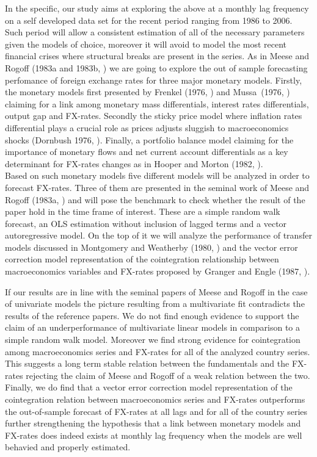 In the specific, our study aims at exploring the above at a monthly lag frequency on a self developed data set for the recent period ranging from 1986 to 2006. Such period will allow a consistent estimation of all of the necessary parameters given the models of choice, moreover it will avoid to model the most recent financial crises where structural breaks are present in the series.
As in Meese and Rogoff (1983a and 1983b, \cite{MeeseRogoffa,MeeseRogoffb}) we are going to explore the out of sample forecasting perfomance of foreign exchange rates for three major monetary models. Firstly, the monetary models first presented by Frenkel (1976, \cite{Frenkel1976}) and  Mussa\ (1976, \cite{Mussa1976}) claiming for a link among monetary mass differentials, interest rates differentials, output gap and FX-rates. Secondly the sticky price model where inflation rates differential plays a crucial role as prices adjusts sluggish to macroeconomics shocks (Dornbush 1976, \cite{Dornbusch}). Finally, a portfolio balance model claiming for the importance of monetary flows and net current account differentials as a key determinant for FX-rates changes as in Hooper and Morton (1982, \cite{HooperMorton1982}). \\
Based on such monetary models five different models will be analyzed in order to forecast FX-rates. Three of them are presented in the seminal work of Meese and Rogoff (1983a, \cite{MeeseRogoffa}) and will pose the benchmark to check whether the result of the paper hold in the time frame of interest. These are a simple random walk forecast, an OLS estimation without inclusion of lagged terms and a vector autoregressive model. On the top of it we will analyze the performance of transfer models discussed in Montgomery and Weatherby (1980, \cite{MontgomeryWeatherby}) and the vector error correction model representation of the cointegration relationship between macroeconomics variables and FX-rates proposed by Granger and Engle (1987,  \cite{EngleGranger}).

If our results are in line with the seminal papers of Meese and Rogoff in the case of univariate models the picture resulting from a multivariate fit
contradicts the results of the reference papers. We do not find enough evidence to support the claim of an underperformance of multivariate
linear models in comparison to a simple random walk model. Moreover we find strong evidence for cointegration among macroeconomics series and
FX-rates for all of the analyzed country series. This suggests a long term stable relation between the fundamentals and the FX-rates rejecting
the claim of Meese and Rogoff of a weak relation between the two. Finally, we do find that a vector error correction model representation of the cointegration
relation between macroeconomics series and FX-rates outperforms the out-of-sample forecast of FX-rates at all lags and for all of the country series further
strengthening the hypothesis that a link between monetary models and FX-rates does indeed exists at monthly lag frequency when the models are well behavied
and properly estimated.

